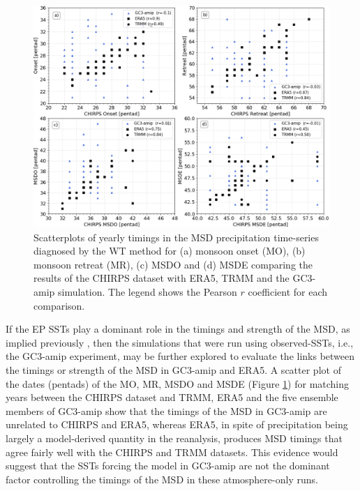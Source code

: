 \begin{figure}[t!]
\includegraphics[width=\linewidth]{figures/master_sst_scatter.png}
\caption{Scatterplots of yearly timings in the MSD precipitation time-series diagnosed by the WT method for (a) monsoon onset (MO), (b) monsoon retreat (MR), (c) MSDO and (d) MSDE comparing the results of the CHIRPS dataset with ERA5, TRMM and the GC3-amip simulation. The legend shows the Pearson $r$ coefficient for each comparison. }
\label{fig:amipsstscatter}
\end{figure}




If the EP SSTs play a dominant role in the timings and strength of the MSD, as implied previously \citep{magana1999,magana2005,herrera2015}, then the simulations that were run using observed-SSTs, i.e., the GC3-amip experiment, may be further explored to evaluate the links  between the timings or strength of the MSD in GC3-amip and ERA5. A scatter plot of the dates (pentads) of the MO, MR, MSDO and MSDE (Figure \ref{fig:amipsstscatter}) for matching years between the CHIRPS dataset and TRMM, ERA5 and the five ensemble members of GC3-amip show that the timings of the MSD in GC3-amip are unrelated to CHIRPS and ERA5, whereas ERA5, in spite of precipitation being largely a model-derived quantity in the reanalysis, produces MSD timings that agree fairly well with the CHIRPS and TRMM datasets. 
This evidence would suggest that the SSTs forcing the model in GC3-amip are not the dominant factor controlling the timings of the MSD in these atmosphere-only runs.

